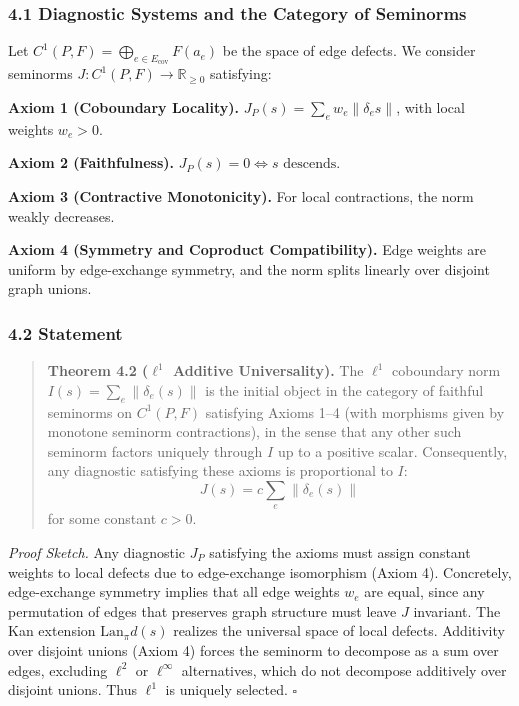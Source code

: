 \documentclass[
]{article}
\begin{document}
\subsubsection{4.1 Diagnostic Systems and the Category of
Seminorms}\label{diagnostic-systems-and-the-category-of-seminorms}

Let \(C^1(P, F) = \bigoplus_{e \in E_{\text{cov}}} F(a_e)\) be the space
of edge defects. We consider seminorms
\(J: C^1(P,F) \to \mathbb{R}_{\geq 0}\) satisfying:

\textbf{Axiom 1 (Coboundary Locality).}
\(J_P(s) = \sum_{e} w_e \|\delta_e s\|\), with local weights
\(w_e > 0\).

\textbf{Axiom 2 (Faithfulness).} \(J_P(s) = 0 \iff s \text{ descends}\).

\textbf{Axiom 3 (Contractive Monotonicity).} For local contractions, the
norm weakly decreases.

\textbf{Axiom 4 (Symmetry and Coproduct Compatibility).} Edge weights
are uniform by edge-exchange symmetry, and the norm splits linearly over
disjoint graph unions.

\subsubsection{4.2 Statement}\label{statement-1}

\begin{quote}
\textbf{Theorem 4.2 (\(\ell^1\) Additive Universality).} The \(\ell^1\)
coboundary norm \(I(s) = \sum_e \|\delta_e(s)\|\) is the initial object
in the category of faithful seminorms on \(C^1(P,F)\) satisfying Axioms
1--4 (with morphisms given by monotone seminorm contractions), in the
sense that any other such seminorm factors uniquely through \(I\) up to
a positive scalar. Consequently, any diagnostic satisfying these axioms
is proportional to \(I\): \[J(s) = c \sum_e \|\delta_e(s)\|\] for some
constant \(c > 0\).
\end{quote}

\emph{Proof Sketch.} Any diagnostic \(J_P\) satisfying the axioms must
assign constant weights to local defects due to edge-exchange
isomorphism (Axiom 4). Concretely, edge-exchange symmetry implies that
all edge weights \(w_e\) are equal, since any permutation of edges that
preserves graph structure must leave \(J\) invariant. The Kan extension
\(\mathrm{Lan}_\pi d(s)\) realizes the universal space of local defects.
Additivity over disjoint unions (Axiom 4) forces the seminorm to
decompose as a sum over edges, excluding \(\ell^2\) or \(\ell^\infty\)
alternatives, which do not decompose additively over disjoint unions.
Thus \(\ell^1\) is uniquely selected. \(\square\)
\end{document}
